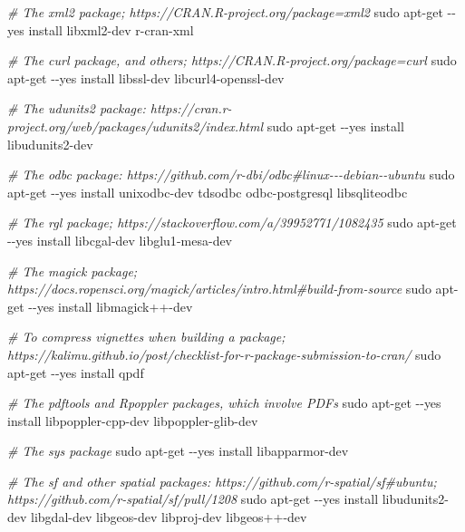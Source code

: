 \documentclass[
]{book}
\newenvironment{Shaded}{\begin{snugshade}}{\end{snugshade}}
\newcommand{\CommentTok}[1]{\textcolor[rgb]{0.56,0.35,0.01}{\textit{#1}}}
\newcommand{\FunctionTok}[1]{\textcolor[rgb]{0.00,0.00,0.00}{#1}}
\newcommand{\NormalTok}[1]{#1}
\newcommand{\StringTok}[1]{\textcolor[rgb]{0.31,0.60,0.02}{#1}}
\begin{document}
\begin{Shaded}
\begin{Highlighting}[]
  \CommentTok{\# The \textquotesingle{}xml2\textquotesingle{} package; https://CRAN.R{-}project.org/package=xml2}
  \FunctionTok{sudo}\NormalTok{ apt{-}get {-}{-}yes install libxml2{-}dev r{-}cran{-}xml}

  \CommentTok{\# The \textquotesingle{}curl\textquotesingle{} package, and others; https://CRAN.R{-}project.org/package=curl}
  \FunctionTok{sudo}\NormalTok{ apt{-}get {-}{-}yes install libssl{-}dev libcurl4{-}openssl{-}dev}

  \CommentTok{\# The \textquotesingle{}udunits2\textquotesingle{} package: https://cran.r{-}project.org/web/packages/udunits2/index.html}
  \FunctionTok{sudo}\NormalTok{ apt{-}get {-}{-}yes install libudunits2{-}dev}

  \CommentTok{\# The \textquotesingle{}odbc\textquotesingle{} package: https://github.com/r{-}dbi/odbc\#linux{-}{-}{-}debian{-}{-}ubuntu}
  \FunctionTok{sudo}\NormalTok{ apt{-}get {-}{-}yes install unixodbc{-}dev tdsodbc odbc{-}postgresql libsqliteodbc}

  \CommentTok{\# The \textquotesingle{}rgl\textquotesingle{} package; https://stackoverflow.com/a/39952771/1082435}
  \FunctionTok{sudo}\NormalTok{ apt{-}get {-}{-}yes install libcgal{-}dev libglu1{-}mesa{-}dev}

  \CommentTok{\# The \textquotesingle{}magick\textquotesingle{} package; https://docs.ropensci.org/magick/articles/intro.html\#build{-}from{-}source}
  \FunctionTok{sudo}\NormalTok{ apt{-}get {-}{-}yes install }\StringTok{\textquotesingle{}libmagick++{-}dev\textquotesingle{}}

  \CommentTok{\# To compress vignettes when building a package; https://kalimu.github.io/post/checklist{-}for{-}r{-}package{-}submission{-}to{-}cran/}
  \FunctionTok{sudo}\NormalTok{ apt{-}get {-}{-}yes install qpdf}

  \CommentTok{\# The \textquotesingle{}pdftools\textquotesingle{} and \textquotesingle{}Rpoppler\textquotesingle{} packages, which involve PDFs}
  \FunctionTok{sudo}\NormalTok{ apt{-}get {-}{-}yes install libpoppler{-}cpp{-}dev libpoppler{-}glib{-}dev}

  \CommentTok{\# The \textquotesingle{}sys\textquotesingle{} package}
  \FunctionTok{sudo}\NormalTok{ apt{-}get {-}{-}yes install libapparmor{-}dev}

  \CommentTok{\# The \textquotesingle{}sf\textquotesingle{} and other spatial packages: https://github.com/r{-}spatial/sf\#ubuntu; https://github.com/r{-}spatial/sf/pull/1208}
  \FunctionTok{sudo}\NormalTok{ apt{-}get {-}{-}yes install libudunits2{-}dev libgdal{-}dev libgeos{-}dev libproj{-}dev libgeos++{-}dev}


\end{Highlighting}
\end{Shaded}
\end{document}
